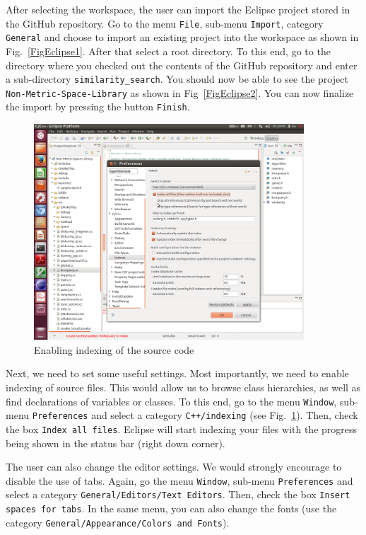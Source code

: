 \documentclass[runningheads,a4paper]{llncs}
\newcommand{\ttt}[1]{\texttt{#1}}
\begin{document}
{After selecting the workspace, the user can import the Eclipse project
stored in the GitHub repository.
Go to the menu \ttt{File}, sub-menu \ttt{Import}, category \ttt{General} 
and choose to import
an existing project into the workspace as shown in Fig.~\ref{FigEclipse1}.
After that select a root directory. To this end,
go to the directory where you checked out the contents 
of the GitHub repository and enter a sub-directory \ttt{similarity\_search}.
You should now be able to see the project \ttt{Non-Metric-Space-Library}
as shown in Fig~\ref{FigEclipse2}.
You can now finalize the import by pressing the button \ttt{Finish}.

\begin{figure}
\centering
\caption{\label{FigEclipse3}Enabling indexing of the source code}
\includegraphics[width=0.9\textwidth]{figures/Eclipse3.pdf}
\end{figure}

Next, we need to set some useful settings.
Most importantly, we need to enable indexing of source files.
This would allow us to browse class hierarchies, as well as find declarations
of variables or classes.
To this end, go to the menu \ttt{Window}, sub-menu \ttt{Preferences}
and select a category \ttt{C++/indexing} (see Fig.~\ref{FigEclipse3}).
Then, check the box \ttt{Index all files}.
Eclipse will start indexing your files 
with the progress being shown in the status bar (right down corner).

The user can also change the editor settings. 
We would strongly encourage to disable the use of tabs.
Again, go the menu \ttt{Window}, sub-menu \ttt{Preferences}
and select a category \ttt{General/Editors/Text Editors}.
Then, check the box \ttt{Insert spaces for tabs}.
In the same menu, you can also change the fonts (use the
category \ttt{General/Appearance/Colors and Fonts}).

}
\end{document}
